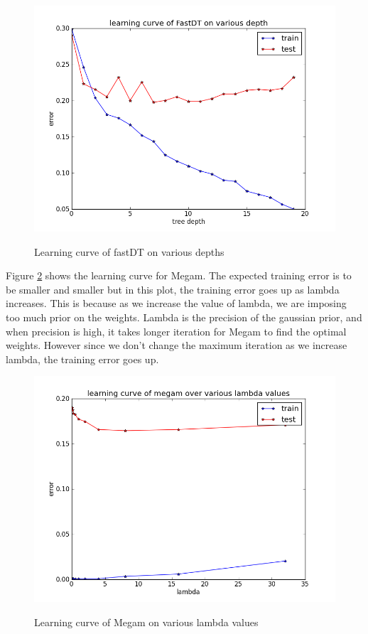 \documentclass[a4paper,11pt]{article}
\begin{document}
\begin{figure}[!ht]
  \begin{center}
  \caption{Learning curve of fastDT on various depths}
  \includegraphics[width=4.5in]{WU6/learningCurve_FastDT.png}
  \label{figures:wu61}
  \end{center}
\end{figure}

Figure \ref{figures:wu62} shows the learning curve for Megam. The
expected training error is to be smaller and smaller but in this plot,
the training error goes up as lambda increases. This is because as we
increase the value of lambda, we are imposing too much prior on the
weights. Lambda is the precision of the gaussian prior, and when
precision is high, it takes longer iteration for Megam to find the
optimal weights. However since we don't change the maximum iteration as we
increase lambda, the training error goes up.\\

\begin{figure}[!ht]
  \begin{center}
  \caption{Learning curve of Megam on various lambda values}
  \includegraphics[width=4.5in]{WU6/learningCurve_megam.png}
  \label{figures:wu62}
  \end{center}
\end{figure}
\end{document}
